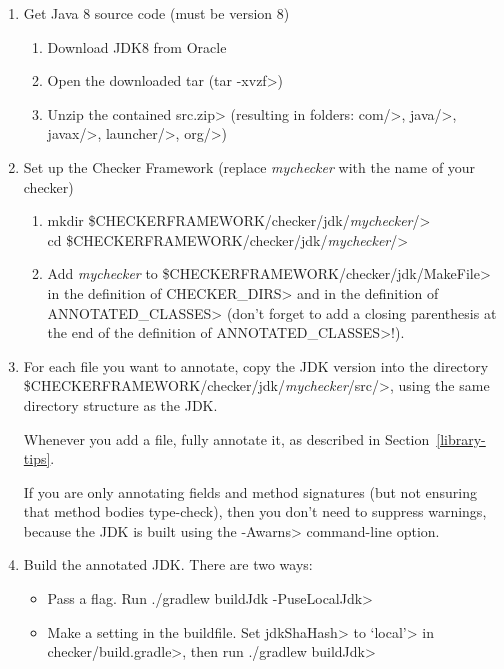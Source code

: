 \begin{enumerate}
\item
Get Java 8 source code (must be version 8)
\begin{enumerate}
\item Download JDK8 from Oracle
\item Open the downloaded tar (\<tar -xvzf>)
\item Unzip the contained \<src.zip> (resulting in folders: \<com/>, \<java/>, \<javax/>, \<launcher/>, \<org/>)
\end{enumerate}

\item
Set up the Checker Framework (replace \textit{mychecker} with the name of your checker)
\begin{enumerate}
\item \<mkdir \$CHECKERFRAMEWORK/checker/jdk/\textit{mychecker}/> \\
  \<cd \$CHECKERFRAMEWORK/checker/jdk/\textit{mychecker}/> \\

\item Add \textit{mychecker} to
  \<\$CHECKERFRAMEWORK/checker/jdk/MakeFile> in the  definition of
  \<CHECKER\_DIRS> and in the definition of \<ANNOTATED\_CLASSES> (don't forget
  to add a closing parenthesis at the end of the definition of \<ANNOTATED\_CLASSES>!).

\end{enumerate}

\item
For each file you want to annotate, copy the JDK version into the
directory
\<\$CHECKERFRAMEWORK/checker/jdk/\textit{mychecker}/src/>, using
the same directory structure as the JDK\@.

Whenever you add a file, fully annotate it, as described in
Section~\ref{library-tips}.

If you are only annotating fields and method signatures (but not
ensuring that method bodies type-check), then you don't need to suppress
warnings, because the JDK is built using the \<-Awarns> command-line
option.

\item
Build the annotated JDK\@.  There are two ways:
\begin{itemize}
\item
  Pass a flag.
  Run \<./gradlew buildJdk -PuseLocalJdk>
\item
  Make a setting in the buildfile.
  Set \<jdkShaHash> to \<`local'> in \<checker/build.gradle>, then
  run \<./gradlew buildJdk>
\end{itemize}


\end{enumerate}
